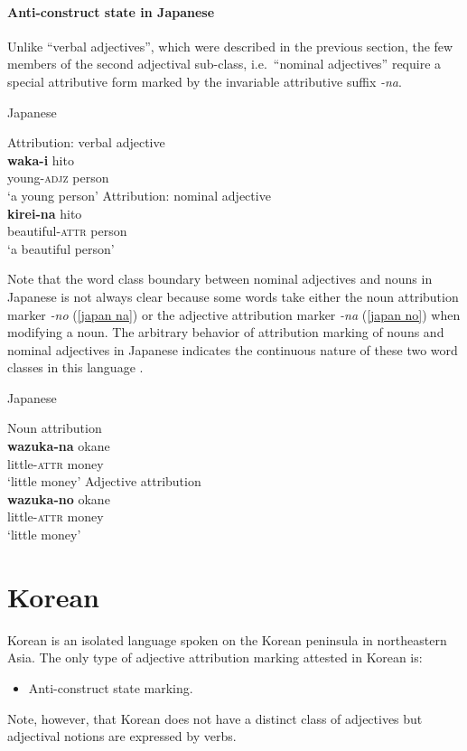 \paragraph*{Anti\hyp{}construct state in Japanese}
Unlike “verbal adjectives”, which were described in the previous section, the few members of the second adjectival sub-class, i.e.~“nominal adjectives” require a special attributive form marked by the invariable attributive suffix \textit{-na}.
\begin{exe}
\ex \rm{Japanese \citep[72–81]{pustet1989}}%
\begin{xlist}
\ex \rm{Attribution: verbal adjective}\\
\gll	\textbf{waka-i} hito\\
	young-\textsc{adjz} person\\
\glt	‘a young person’
\ex \rm{Attribution: nominal adjective}\\
\gll	\textbf{kirei-na} hito\\
	beautiful-\textsc{attr} person\\
\glt	‘a beautiful person’
\end{xlist}
\end{exe}
Note that the word class boundary between nominal adjectives and nouns in Japanese is not always clear because some words take either the noun attribution marker \textit{-no} (\ref{japan na}) or the adjective attribution marker \textit{-na} (\ref{japan no}) when modifying a noun. The arbitrary behavior of attribution marking of nouns and nominal adjectives in Japanese indicates the continuous nature of these two word classes in this language \citep[79–80]{pustet1989}.
\begin{exe}
\ex \rm{Japanese \citep[72–81]{pustet1989}}%
\begin{xlist}
\ex \rm{Noun attribution}\\ \label{japan na}
\gll	\textbf{wazuka-na} okane\\
	little-\textsc{attr} money\\
\glt	‘little money’
\ex \rm{Adjective attribution}\\ \label{japan no}
\gll	\textbf{wazuka-no} okane\\
	little-\textsc{attr} money\\
\glt	‘little money’
\end{xlist}
\end{exe}

\section{Korean}
Korean is an isolated language spoken on the Korean peninsula in northeastern Asia. The only type of adjective attribution marking attested in Korean is:
\begin{itemize}
\item Anti\hyp{}construct state marking.
\end{itemize}
Note, however, that Korean does not have a distinct class of adjectives but adjectival notions are expressed by verbs.

